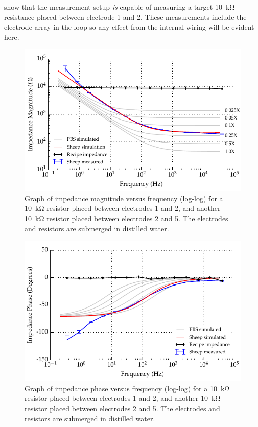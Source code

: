  show that the measurement setup \emph{is} capable of measuring a target \SI{10}{\kilo\ohm} resistance placed between electrode 1 and 2.
These measurements include the electrode array in the loop so any effect from the internal wiring will be evident here.


\begin{figure}
    \centering
    \includegraphics[width=\textwidth]{content/appendices/Solution-Impedance-Measurements/graphics/run14_calibration_10k_water_ZVsF_graph_mag}
    \caption{\label{fig:calibration_10kRes_water_mag}Graph of impedance magnitude versus frequency (log-log) for a \SI{10}{\kilo\ohm} resistor placed between electrodes 1 and 2, and another \SI{10}{\kilo\ohm} resistor placed between electrodes 2 and 5. The electrodes and resistors are submerged in distilled water.}
\end{figure}

\begin{figure}
    \centering
    \includegraphics[width=\textwidth]{content/appendices/Solution-Impedance-Measurements/graphics/run14_calibration_10k_water_ZVsF_graph_phase}
    \caption{\label{fig:calibration_10kRes_water_phase}Graph of impedance phase versus frequency (log-log) for a \SI{10}{\kilo\ohm} resistor placed between electrodes 1 and 2, and another \SI{10}{\kilo\ohm} resistor placed between electrodes 2 and 5. The electrodes and resistors are submerged in distilled water.}
\end{figure}

